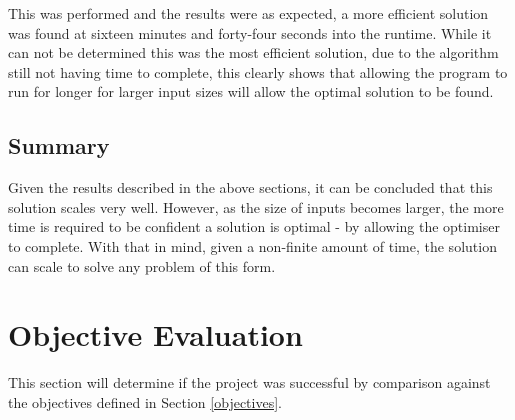 This was performed and the results were as expected, a more efficient solution was found at sixteen minutes and forty-four seconds into the runtime. While it can not be determined this was the most efficient solution, due to the algorithm still not having time to complete, this clearly shows that allowing the program to run for longer for larger input sizes will allow the optimal solution to be found. 

\subsection{Summary}
Given the results described in the above sections, it can be concluded that this solution scales very well. However, as the size of inputs becomes larger, the more time is required to be confident a solution is optimal - by allowing the optimiser to complete. With that in mind, given a non-finite amount of time, the solution can scale to solve any problem of this form.

\section{Objective Evaluation}\label{objectiveeval}
This section will determine if the project was successful by comparison against the objectives defined in Section \ref{objectives}.

